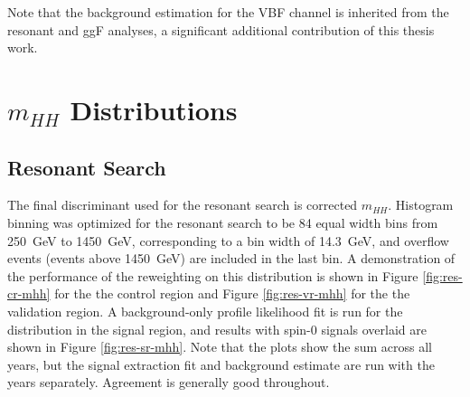 Note that the background estimation for the VBF channel is inherited from the resonant 
and ggF analyses, a significant additional contribution of this thesis work.

\section{$m_{HH}$ Distributions}
\subsection{Resonant Search}
The final discriminant used for the resonant search is corrected $m_{HH}$. Histogram binning was 
optimized for the resonant search to be 84 equal width bins from \SI{250}{\GeV} to \SI{1450}{\GeV}, 
corresponding to a bin width of \SI{14.3}{\GeV}, and overflow events (events above \SI{1450}{\GeV}) 
are included in the last bin. A demonstration of the performance of the reweighting on this 
distribution is shown in Figure \ref{fig:res-cr-mhh} for the the control region and Figure \ref{fig:res-vr-mhh} for 
the the validation region. A background-only profile likelihood fit is run for the distribution in the signal 
region, and results with spin-0 signals overlaid are shown in Figure \ref{fig:res-sr-mhh}. Note that 
the plots show the sum across all years, but the signal extraction fit and background estimate are run with the 
years separately. Agreement is generally good throughout.

